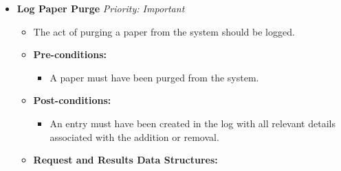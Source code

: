 \documentclass{article}
\begin{document}
\begin{itemize}
					\item \textbf{Log Paper Purge} \hfill \textit{Priority: Important}
					\begin{itemize}
						\item The act of purging a paper from the system should be logged.
						\item \textbf{Pre-conditions:}
						\begin{itemize}
							\item A paper must have been purged from the system.
						\end{itemize}
						\item \textbf{Post-conditions:}
						\begin{itemize}
							\item An entry must have been created in the log with all relevant details associated with the addition or removal.
						\end{itemize}
						\item \textbf{Request and Results Data Structures:}
					\end{itemize}
				\end{itemize}
\end{document}
